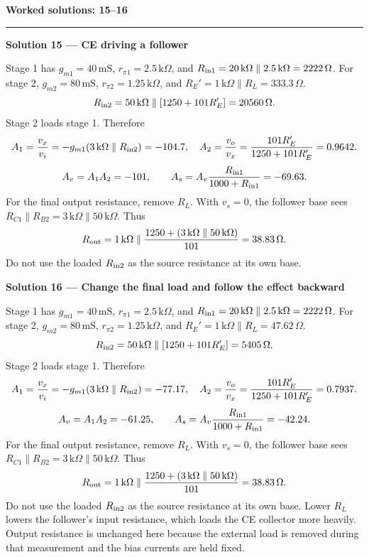 \documentclass[11pt,a4paper]{article}
\newcommand{\K}{\,\mathrm{k}\Omega}\newcommand{\Oh}{\,\Omega}\newcommand{\mS}{\,\mathrm{mS}}
\newcommand{\head}[1]{\par{\Large\bfseries\color{ink}#1}\par\vspace{3pt}\hrule\vspace{7pt}}
\newcommand{\sol}[2]{\par{\large\bfseries\color{ink}Solution #1 --- #2}\label{sol:#1}\par}
\begin{document}
\newpage
\head{Worked solutions: 15--16}
\sol{15}{CE driving a follower}Stage 1 has $g_{m1}=40\mS$, $r_{\pi1}=2.5\K$, and $R_{\rm in1}=20\K\parallel2.5\K=2222\Oh$.
For stage 2, $g_{m2}=80\mS$, $r_{\pi2}=1.25\K$, and $R_E'=1\K\parallel R_L=333.3\Oh$.
\[R_{\rm in2}=50\K\parallel[1250+101R_E']=20560\Oh.\]
Stage 2 loads stage 1. Therefore
\[A_1=\frac{v_x}{v_i}=-g_{m1}(3\K\parallel R_{\rm in2})=-104.7,\quad
A_2=\frac{v_o}{v_x}=\frac{101R_E'}{1250+101R_E'}=0.9642.\]
\[A_v=A_1A_2=-101,\qquad A_s=A_v\frac{R_{\rm in1}}{1000+R_{\rm in1}}=-69.63.\]
For the final output resistance, remove $R_L$. With $v_s=0$, the follower base sees $R_{C1}\parallel R_{B2}=3\K\parallel50\K$. Thus
\[R_{\rm out}=1\K\parallel\frac{1250+(3\K\parallel50\K)}{101}=38.83\Oh.\]
Do not use the loaded $R_{\rm in2}$ as the source resistance at its own base.\par\vfill
\sol{16}{Change the final load and follow the effect backward}Stage 1 has $g_{m1}=40\mS$, $r_{\pi1}=2.5\K$, and $R_{\rm in1}=20\K\parallel2.5\K=2222\Oh$.
For stage 2, $g_{m2}=80\mS$, $r_{\pi2}=1.25\K$, and $R_E'=1\K\parallel R_L=47.62\Oh$.
\[R_{\rm in2}=50\K\parallel[1250+101R_E']=5405\Oh.\]
Stage 2 loads stage 1. Therefore
\[A_1=\frac{v_x}{v_i}=-g_{m1}(3\K\parallel R_{\rm in2})=-77.17,\quad
A_2=\frac{v_o}{v_x}=\frac{101R_E'}{1250+101R_E'}=0.7937.\]
\[A_v=A_1A_2=-61.25,\qquad A_s=A_v\frac{R_{\rm in1}}{1000+R_{\rm in1}}=-42.24.\]
For the final output resistance, remove $R_L$. With $v_s=0$, the follower base sees $R_{C1}\parallel R_{B2}=3\K\parallel50\K$. Thus
\[R_{\rm out}=1\K\parallel\frac{1250+(3\K\parallel50\K)}{101}=38.83\Oh.\]
Do not use the loaded $R_{\rm in2}$ as the source resistance at its own base. Lower $R_L$ lowers the follower's input resistance, which loads the CE collector more heavily. Output resistance is unchanged here because the external load is removed during that measurement and the bias currents are held fixed.\par\vfill
\end{document}
